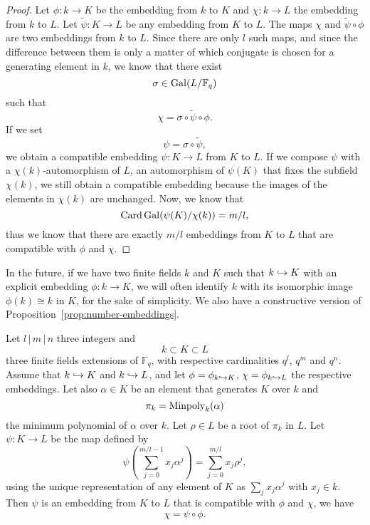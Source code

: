  \begin{proof}
    Let $\phi:k\to K$ be the embedding from $k$ to $K$ and $\chi:k\to L$ the
    embedding from $k$ to $L$. Let $\widetilde\psi:K\to L$ be any embedding from $K$ to
    $L$. The maps $\chi$ and $\widetilde\psi\circ\phi$ are two embeddings from
    $k$ to $L$. Since there are only $l$ such maps, and since the difference
    between them is only a matter of which conjugate is chosen for a generating
    element in $k$, we know that there exist
    \[
      \sigma\in\operatorname{Gal}(L/\mathbb{F}_q)
    \]
    such that
    \[
      \chi = \sigma\circ\widetilde\psi\circ\phi.
    \]
    If we set
    \[
      \psi=\sigma\circ\widetilde\psi,
    \]
    we obtain a compatible embedding $\psi:K\to L$ from $K$ to $L$. If we
    compose $\psi$ with a $\chi(k)$-automorphism of $L$, \ie an automorphism of
    $\psi(K)$ that
    fixes the subfield $\chi(k)$, we still obtain a compatible embedding because
    the images of the elements in $\chi(k)$ are unchanged. Now, we know that
    \[
      \operatorname{Card}\operatorname{Gal}(\psi(K)/\chi(k)) = m/l,
    \]
    thus we know that there are exactly $m/l$ embeddings from $K$ to $L$ that
    are compatible with $\phi$ and $\chi$.
  \end{proof}
  In the future, if we have two finite fields $k$ and $K$ such that $k\hookrightarrow K$
  with an explicit embedding $\phi:k\to K$, we will often identify $k$ with
  its isomorphic image $\phi(k)\cong k$ in $K$, for the sake of simplicity. We
  also have a constructive version of Proposition~\ref{prop:number-embeddings}.
\begin{prop}
    \label{prop:number-embeddings}
    Let $l\,|\,m\,|\,n$ three integers and
    \[
      k\subset K\subset L
    \]
    three finite fields extensions of $\mathbb{F}_q$, with respective
    cardinalities $q^l$, $q^m$ and $q^n$. Assume that $k\hookrightarrow K$ and $k\hookrightarrow L$,
    and let $\phi=\phi_{k\hookrightarrow K}$, $\chi=\phi_{k\hookrightarrow L}$ the respective embeddings.
    Let also $\alpha\in K$ be an element that generates $K$ over $k$ and
    \[
      \pi_k=\operatorname{Minpoly}_k(\alpha)
    \]
    the minimum polynomial of $\alpha$ over $k$. Let $\rho\in L$ be a root of
    $\pi_k$ in $L$. Let $\psi:K\to L$ be the map defined by
    \[
      \psi(\sum_{j=0}^{m/l-1}x_j\alpha^j) = \sum_{j=0}^{m/l}x_j\rho^j,
    \]
    using the unique representation of any element of $K$ as $\sum_j x_j
    \alpha^j$ with $x_j\in k$. Then $\psi$ is an embedding from $K$ to $L$ that
    is compatible with $\phi$ and $\chi$, \ie we have
    \[
      \chi = \psi\circ\phi.
    \]
  \end{prop}
